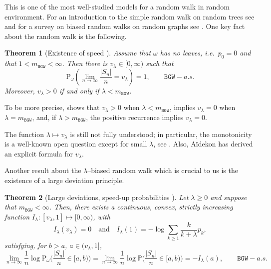\documentclass[11 pt]{article}
\newtheorem{theorem}{Theorem}[section]
\theoremstyle{definition}
\numberwithin{equation}{section}
\newcommand{\PP}{\mathbb{P}} %
\newcommand{\Pws}{\mathrm{P}_{\omega}} %
\begin{document}
This is one of the most well-studied models for a random walk in random environment. For an introduction to the simple random walk on random trees see \cite[Chapter 17]{lyons_probability_2016} and for a survey on biased random walks on random graphs see \cite{ben_arous_biased_2016}. One key fact about the random walk is the following. 

\begin{theorem}[Existence of speed {\cite{lyons_biased_1996,PerZei08,Lyo90}}]\label{thm:speedRW}
	 Assume that $\omega$ has no leaves, i.e.\ $p_0=0$ and that $1<m_{\mathtt{BGW}}<\infty$. Then there is $v_\lambda \in [0,\infty)$ such that 
\begin{equation*}
	\Pws\left(\lim_{n \to \infty} \frac{\vert S_n \vert}{n} = v_\lambda\right)=1, \qquad  \mathtt{BGW}-a.s.
\end{equation*}
Moreover, $v_\lambda>0$ if and only if $\lambda<m_{\mathtt{BGW}}$.
\end{theorem}

To be more precise, \cite[Theorem 3.1]{lyons_biased_1996} shows that $v_\lambda>0$ when $\lambda<m_{\mathtt{BGW}}$,  \cite[Theorem~1]{PerZei08} implies $v_\lambda=0$ when $\lambda=m_{\mathtt{BGW}}$, and, if $\lambda>m_{\mathtt{BGW}}$, the positive recurrence \cite[Page 944]{Lyo90} implies $v_\lambda=0$. 

The function $\lambda \mapsto v_\lambda$ is still not fully understood; in particular, the monotonicity is a well-known open question except for small $\lambda$, see \cite{ben_arous_lyons-pemantle-peres_2014}. Also, Aïdekon \cite{aidekon_speed_2014} has derived an explicit formula for $v_\lambda$. 


Another result about the $\lambda$--biased random walk which is crucial to us is the existence of a large deviation principle. 

\begin{theorem}[Large deviations, speed-up probabilities {\cite[Theorem~1.1]{DGPZ-ld}}]\label{lem:ld}
	Let $\lambda \geq 0$ and suppose that  $m_{\mathtt{BGW}}<\infty$. Then, there exists a continuous, convex, strictly increasing function 
	$I_{\lambda}: [v_{\lambda},1]\mapsto [0,\infty)$, with 
	\[
		I_{\lambda}(v_{\lambda})= 0 \quad \text{and} \quad I_{\lambda}(1) = -\log \sum_{k\ge 1} \frac{k}{k+\lambda} p_k, 
	\] 
	satisfying, for $b>a$, $a\in (v_{\lambda},1]$, 
	\begin{equation}
 		\lim_{n\to \infty} \frac{1}{n}\log \Pws \Big( \frac{|S_n|}{n}\in [a,b) \Big)
 		= \lim_{n\to \infty}  \frac{1}{n} \log \PP \Big( \frac{|S_n|}{n}\in [a,b) \Big) = -I_{\lambda}(a), \qquad 		\mathtt{BGW}-a.s.
	\end{equation}
\end{theorem}
\end{document}
